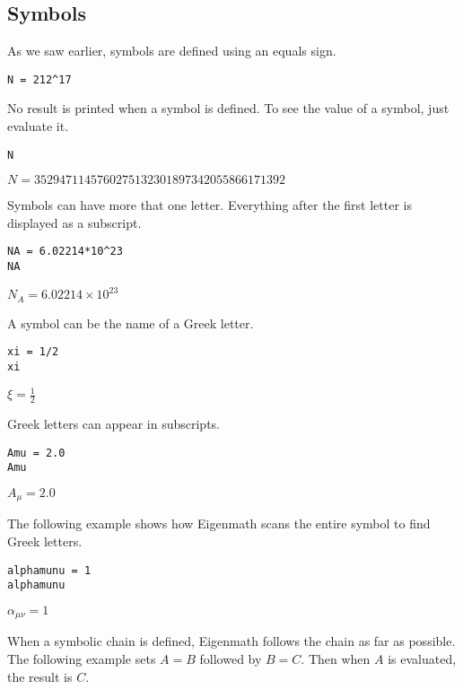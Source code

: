 
\subsection{Symbols}
As we saw earlier, symbols are defined using an equals sign.

\begin{Verbatim}[formatcom=\color{blue}]
N = 212^17
\end{Verbatim}

No result is printed when a symbol is defined.
To see the value of a symbol, just evaluate it.

\begin{Verbatim}[formatcom=\color{blue}]
N
\end{Verbatim}

$\displaystyle N=3529471145760275132301897342055866171392$

Symbols can have more that one letter.
Everything after the first letter is displayed as a subscript.

\begin{Verbatim}[formatcom=\color{blue}]
NA = 6.02214*10^23
NA
\end{Verbatim}

$\displaystyle N_A=6.02214\times10^{23}$

A symbol can be the name of a Greek letter.

\begin{Verbatim}[formatcom=\color{blue}]
xi = 1/2
xi
\end{Verbatim}

$\displaystyle \xi=\frac{1}{2}$

Greek letters can appear in subscripts.

\begin{Verbatim}[formatcom=\color{blue}]
Amu = 2.0
Amu
\end{Verbatim}

$\displaystyle A_\mu=2.0$

The following example shows how
Eigenmath scans the entire symbol to find Greek letters.

\begin{Verbatim}[formatcom=\color{blue}]
alphamunu = 1
alphamunu
\end{Verbatim}

$\displaystyle \alpha_{\mu\nu}=1$

When a symbolic chain is defined,
Eigenmath follows the chain as far as possible.
The following example sets $A=B$ followed by $B=C$.
Then when $A$ is evaluated, the result is $C$.

